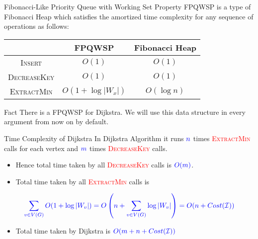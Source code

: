 \documentclass[10pt]{beamer}
\begin{document}
\begin{frame}{Fibonacci-Like Priority Queue with Working Set Property}
	FPQWSP  is a type of Fibonacci Heap which satisfies the amortized time complexity for any sequence of operations as follows:\vfill \pause

	\begin{center}
		\begin{tabular}{|c|c|c|}
			\hline
			                     & FPQWSP           & Fibonacci Heap \\ \hline
			\textsc{Insert}      & $O(1)$           & $O(1)$         \\ \hline
			\textsc{DecreaseKey} & $O(1)$           & $O(1)$         \\ \hline
			\textsc{ExtractMin}  & $O(1+\log|W_x|)$ & $O(\log n)$    \\ \hline
		\end{tabular}
	\end{center}\pause
	\vfill


	\begin{alertblock}{Fact}
		There is a FPQWSP for Dijkstra. We will use this data structure in every argument from now on by default.
	\end{alertblock}
\end{frame}
\begin{frame}{Time Complexity of Dijkstra}
	In Dijkstra Algorithm it runs $\mathcolor{blue}{n}$ times \textcolor{red}{\textsc{ExtractMin}} calls for each vertex and $\mathcolor{blue}{m}$ times \textcolor{red}{\textsc{DecreaseKey}} calls.\pause
	\begin{itemize}
		\item Hence total time taken by all \textcolor{red}{\textsc{DecreaseKey}} calls is $\mathcolor{blue}{O(m)}$.\pause
		\item Total time taken by all \textcolor{red}{\textsc{ExtractMin}} calls is
	\end{itemize}
	$$
		\mathcolor{blue}{\sum\limits_{v\in V(G)}O(1+\log|W_v|)= O\left(n+\sum\limits_{v\in V(G)} \log |W_v| \right)= O(n+Cost(\mathcal{I}))}
	$$
	\begin{itemize}
		\item Total time taken by Dijkstra is $\mathcolor{blue}{O(m+n+Cost(\mathcal{I}))}$
	\end{itemize}
\end{frame}
\end{document}
